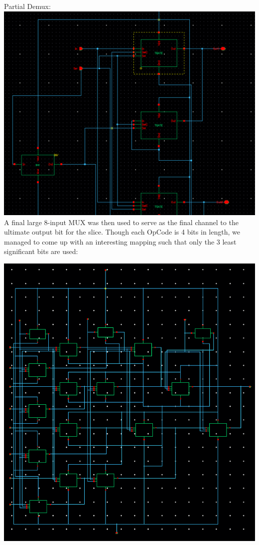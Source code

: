 \documentclass[12pt]{article}
\begin{document}
  Partial Demux:\\
  \includegraphics[scale=0.4]{demuxpart.png}
  \\
	
	A final large 8-input MUX was then used to serve as the final channel to the ultimate output 
	bit for the slice. Though each OpCode is 4 bits in length, we managed to come up with an 
	interesting mapping such that only the 3 least significant bits are used:
	
  \includegraphics[scale=0.4]{8mux.png}
  \\
	
\end{document}
